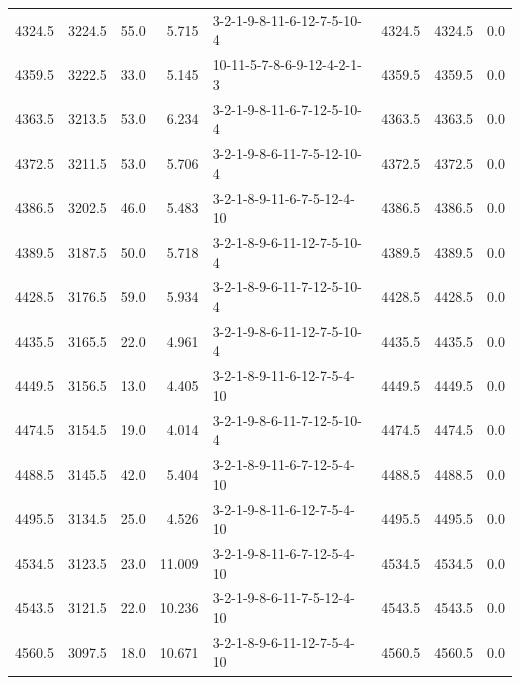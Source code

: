\begin{tabular}{rrrrlrrr}
 4324.5 &  3224.5 &           55.0 &              5.715 &  3-2-1-9-8-11-6-12-7-5-10-4 &        4324.5 &          4324.5 &       0.0 \\
 4359.5 &  3222.5 &           33.0 &              5.145 &  10-11-5-7-8-6-9-12-4-2-1-3 &        4359.5 &          4359.5 &       0.0 \\
 4363.5 &  3213.5 &           53.0 &              6.234 &  3-2-1-9-8-11-6-7-12-5-10-4 &        4363.5 &          4363.5 &       0.0 \\
 4372.5 &  3211.5 &           53.0 &              5.706 &  3-2-1-9-8-6-11-7-5-12-10-4 &        4372.5 &          4372.5 &       0.0 \\
 4386.5 &  3202.5 &           46.0 &              5.483 &  3-2-1-8-9-11-6-7-5-12-4-10 &        4386.5 &          4386.5 &       0.0 \\
 4389.5 &  3187.5 &           50.0 &              5.718 &  3-2-1-8-9-6-11-12-7-5-10-4 &        4389.5 &          4389.5 &       0.0 \\
 4428.5 &  3176.5 &           59.0 &              5.934 &  3-2-1-8-9-6-11-7-12-5-10-4 &        4428.5 &          4428.5 &       0.0 \\
 4435.5 &  3165.5 &           22.0 &              4.961 &  3-2-1-9-8-6-11-12-7-5-10-4 &        4435.5 &          4435.5 &       0.0 \\
 4449.5 &  3156.5 &           13.0 &              4.405 &  3-2-1-8-9-11-6-12-7-5-4-10 &        4449.5 &          4449.5 &       0.0 \\
 4474.5 &  3154.5 &           19.0 &              4.014 &  3-2-1-9-8-6-11-7-12-5-10-4 &        4474.5 &          4474.5 &       0.0 \\
 4488.5 &  3145.5 &           42.0 &              5.404 &  3-2-1-8-9-11-6-7-12-5-4-10 &        4488.5 &          4488.5 &       0.0 \\
 4495.5 &  3134.5 &           25.0 &              4.526 &  3-2-1-9-8-11-6-12-7-5-4-10 &        4495.5 &          4495.5 &       0.0 \\
 4534.5 &  3123.5 &           23.0 &             11.009 &  3-2-1-9-8-11-6-7-12-5-4-10 &        4534.5 &          4534.5 &       0.0 \\
 4543.5 &  3121.5 &           22.0 &             10.236 &  3-2-1-9-8-6-11-7-5-12-4-10 &        4543.5 &          4543.5 &       0.0 \\
 4560.5 &  3097.5 &           18.0 &             10.671 &  3-2-1-8-9-6-11-12-7-5-4-10 &        4560.5 &          4560.5 &       0.0 \\

\end{tabular}
